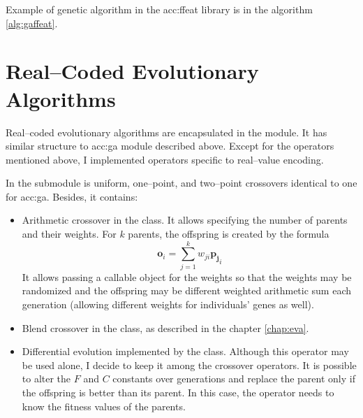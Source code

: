Example of genetic algorithm in the \acrshort{acc:ffeat} library is in the algorithm \ref{alg:gaffeat}.





\section{Real--Coded Evolutionary Algorithms}

Real--coded evolutionary algorithms are encapsulated in the  module. It has similar structure to \acrshort{acc:ga} module described above. Except for the operators mentioned above, I implemented operators specific to real--value encoding.

In the  submodule is uniform, one--point, and two--point crossovers identical to one for \acrshort{acc:ga}. Besides, it contains:
\begin{itemize}
    \item Arithmetic crossover in the  class. It allows specifying the number of parents and their weights. For $k$ parents, the offspring is created by the formula 
    $$\mathbf{o}_i=\sum_{j=1}^k w_{ji}\mathbf{p_j}_i$$
    It allows passing a callable object for the weights so that the weights may be randomized and the offspring may be different weighted arithmetic sum each generation (allowing different weights for individuals' genes as well).
    \item Blend crossover in the  class, as described in the chapter \ref{chap:eva}.
    \item Differential evolution implemented by the  class. Although this operator may be used alone, I decide to keep it among the crossover operators. It is possible to alter the $F$ and $C$ constants over generations and replace the parent only if the offspring is better than its parent. In this case, the operator needs to know the fitness values of the parents.
\end{itemize}

